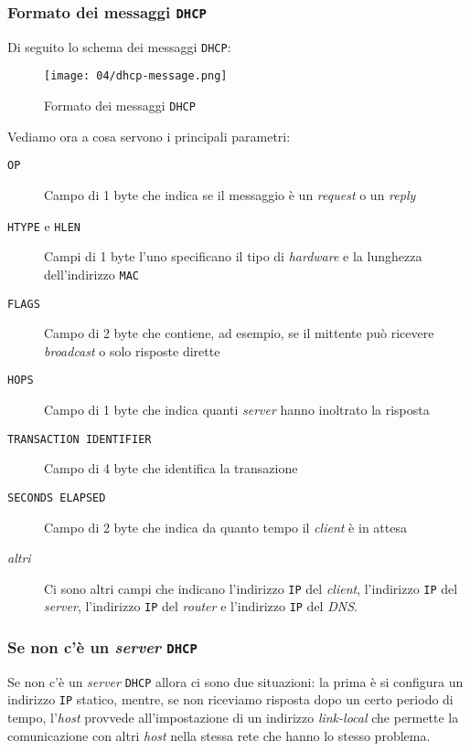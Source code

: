         \subsubsection{Formato dei messaggi \texttt{DHCP}} 
            Di seguito lo schema dei messaggi \texttt{DHCP}:
            
            \begin{figure}[H]
                \centering
                \texttt{[image: 04/dhcp-message.png]}
                \caption{Formato dei messaggi \texttt{DHCP}}
            \end{figure}
            
            Vediamo ora a cosa servono i principali parametri:
            \begin{description}
                \item[\texttt{OP}] Campo di 1 byte che indica se il messaggio è un \textit{request} o un \textit{reply}
                \item[\texttt{HTYPE} e \texttt{HLEN}] Campi di 1 byte l'uno specificano il tipo di \textit{hardware} e la lunghezza dell'indirizzo \texttt{MAC}
                \item[\texttt{FLAGS}] Campo di 2 byte che contiene, ad esempio, se il mittente può ricevere \textit{broadcast} o solo risposte dirette
                \item[\texttt{HOPS}] Campo di 1 byte che indica quanti \textit{server} hanno inoltrato la risposta
                \item[\texttt{TRANSACTION IDENTIFIER}] Campo di 4 byte che identifica la transazione
                \item[\texttt{SECONDS ELAPSED}] Campo di 2 byte che indica da quanto tempo il \textit{client} è in attesa
                \item[\textit{altri}] Ci sono altri campi che indicano l'indirizzo \texttt{IP} del \textit{client}, l'indirizzo \texttt{IP} del \textit{server}, l'indirizzo \texttt{IP} del \textit{router} e l'indirizzo \texttt{IP} del \textit{DNS}.
            \end{description}
        \subsubsection{Se non c'è un \textit{server} \texttt{DHCP}}
            Se non c'è un \textit{server} \texttt{DHCP} allora ci sono due situazioni: la prima è si configura un indirizzo \texttt{IP} statico, mentre, se non riceviamo risposta dopo un certo periodo di tempo, l'\textit{host} provvede all'impostazione di un indirizzo \textit{link-local} che permette la comunicazione con altri \textit{host} nella stessa rete che hanno lo stesso problema.
